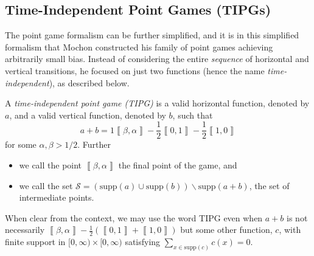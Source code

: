 \documentclass{article}
\newcommand{\supp}{\text{supp}}
\begin{document}
%
%
%
%
%
%
%


%

%
%
%
%
%
%

%
%
%
%
%
%



%



\subsection{Time-Independent Point Games (TIPGs)}
\label{subsec:tipg}

%
%

The point game formalism can be further simplified, and it is in this simplified formalism that Mochon constructed his family of point games achieving arbitrarily small bias. Instead of considering the entire \emph{sequence} of horizontal and vertical transitions,
he focused on just two functions (hence the name \emph{time-independent}), as described below.
\begin{definition}[TIPG]
  \label{def:TIPG}A \emph{time-independent point game (TIPG)} is
  a valid horizontal function, denoted by $a$, and a valid vertical function, denoted by $b$,
  such that
  \begin{displaymath}
    a+b=1\left\llbracket \beta,\alpha\right\rrbracket -\frac{1}{2}\left\llbracket 0,1\right\rrbracket -\frac{1}{2}\left\llbracket 1,0\right\rrbracket
  \end{displaymath}
  for some $\alpha,\beta>1/2$. Further
  \begin{itemize}
    \item we call the point $\left\llbracket \beta,\alpha\right\rrbracket $
          the final point of the game, and
    \item we call the set $\mathcal{S}=\left(\supp(a)\cup\supp(b)\right) \backslash\supp(a+b)$,
          the set of intermediate points.
  \end{itemize}
\end{definition}

\begin{remark}
  When clear from the context, we may use the word TIPG even when $a+b$
  is not necessarily $\left\llbracket \beta,\alpha\right\rrbracket -\frac{1}{2}\left(\left\llbracket 0,1\right\rrbracket +\left\llbracket 1,0\right\rrbracket \right)$
  but some other function, $c$, with finite support in
  $[0,\infty)\times [0,\infty)$
  satisfying $\sum_{x\in\supp(c)}c(x)=0$.
\end{remark}
\end{document}
